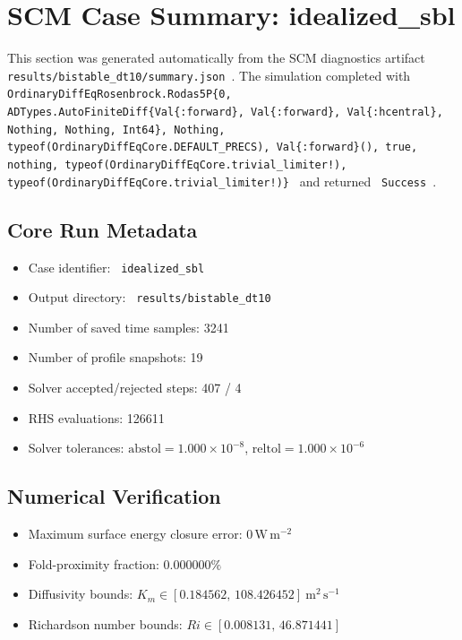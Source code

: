 \section{SCM Case Summary: idealized\_sbl}
\label{sec:scm_case_bistable_dt10_idealized_sbl_100x2m_9h_report}

This section was generated automatically from the SCM diagnostics artifact
\texttt{ results/bistable\_dt10/summary.json }. The simulation completed with \texttt{ OrdinaryDiffEqRosenbrock.Rodas5P\{0, ADTypes.AutoFiniteDiff\{Val\{:forward\}, Val\{:forward\}, Val\{:hcentral\}, Nothing, Nothing, Int64\}, Nothing, typeof(OrdinaryDiffEqCore.DEFAULT\_PRECS), Val\{:forward\}(), true, nothing, typeof(OrdinaryDiffEqCore.trivial\_limiter!), typeof(OrdinaryDiffEqCore.trivial\_limiter!)\} }
and returned \texttt{ Success }.

\subsection{Core Run Metadata}
\begin{itemize}
  \item Case identifier: \texttt{ idealized\_sbl }
  \item Output directory: \texttt{ results/bistable\_dt10 }
  \item Number of saved time samples: 3241
  \item Number of profile snapshots: 19
  \item Solver accepted/rejected steps: 407 / 4
  \item RHS evaluations: 126611
  \item Solver tolerances: $\mathrm{abstol}=1.000 \times 10^{-8}$, $\mathrm{reltol}=1.000 \times 10^{-6}$
\end{itemize}

\subsection{Numerical Verification}
\begin{itemize}
  \item Maximum surface energy closure error:
  $0\,\mathrm{W\,m^{-2}}$
  \item Fold-proximity fraction:
  $0.000000\%$
  \item Diffusivity bounds:
  $K_m \in [0.184562,\,108.426452]~\mathrm{m^2\,s^{-1}}$
  \item Richardson number bounds:
  $Ri \in [0.008131,\,46.871441]$
\end{itemize}


